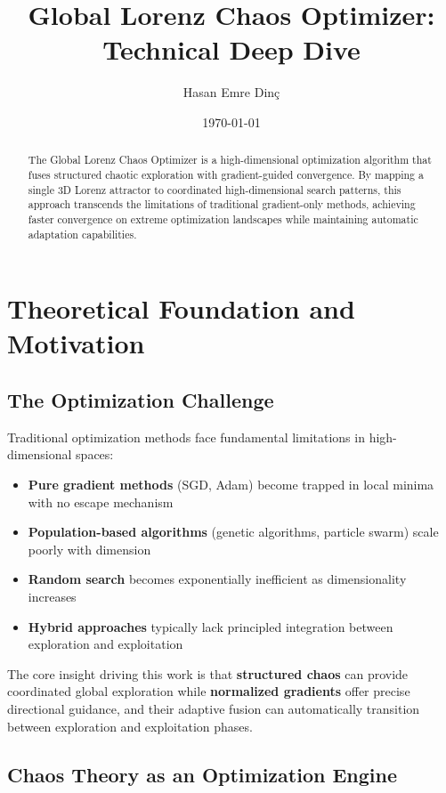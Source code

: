 \documentclass[11pt,a4paper]{article}
\title{Global Lorenz Chaos Optimizer: Technical Deep Dive}
\author{Hasan Emre Dinç}
\date{\today}
\begin{document}
\maketitle

\begin{abstract}
The Global Lorenz Chaos Optimizer is a high-dimensional optimization algorithm that fuses structured chaotic exploration with gradient-guided convergence. By mapping a single 3D Lorenz attractor to coordinated high-dimensional search patterns, this approach transcends the limitations of traditional gradient-only methods, achieving faster convergence on extreme optimization landscapes while maintaining automatic adaptation capabilities.
\end{abstract}

\section{Theoretical Foundation and Motivation}

\subsection{The Optimization Challenge}

Traditional optimization methods face fundamental limitations in high-dimensional spaces:

\begin{itemize}
\item \textbf{Pure gradient methods} (SGD, Adam) become trapped in local minima with no escape mechanism
\item \textbf{Population-based algorithms} (genetic algorithms, particle swarm) scale poorly with dimension
\item \textbf{Random search} becomes exponentially inefficient as dimensionality increases
\item \textbf{Hybrid approaches} typically lack principled integration between exploration and exploitation
\end{itemize}

The core insight driving this work is that \textbf{structured chaos} can provide coordinated global exploration while \textbf{normalized gradients} offer precise directional guidance, and their adaptive fusion can automatically transition between exploration and exploitation phases.

\subsection{Chaos Theory as an Optimization Engine}
\end{document}
